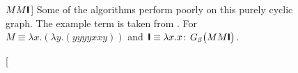 \begin{figure}[htbp]
{	}
	\hspace{0.5em}
	\caption
	[$M M \textsf{\textbf{I}}$]
	{Some of the algorithms perform poorly on this purely cyclic graph. The
	example term is taken from \cite{VenturiniZilli1984251}. For
	$M\equiv\lambda x.(\lambda y.(y y y y x x y))$ and $\textsf{\textbf{I}}\equiv\lambda x.x$:
	$G_\beta\big(M M \textsf{\textbf{I}}\big)$.}
	\label{fig:images_Circle_1}
\end{figure}


